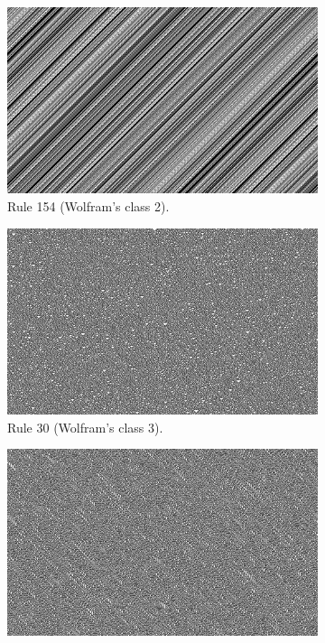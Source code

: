 \documentclass[12pt]{article}
\begin{document}
\begin{figure} [!h]
\begin{subfigure}{.5\textwidth}
  \centering
  \includegraphics[width=.9\linewidth]{rule154}
  \caption{Rule 154 (Wolfram's class 2).}
  \label{fig:rule154}
 \end{subfigure}%
\begin{subfigure}{.5\textwidth}
  \centering
  \includegraphics[width=.9\linewidth]{rule30}
  \caption{Rule 30 (Wolfram's class 3).}
  \label{fig:rule30}
\end{subfigure}
\begin{subfigure}{.5\textwidth}
  \centering
  \includegraphics[width=.9\linewidth]{rule45}

\end{subfigure}
\end{figure}
\end{document}
